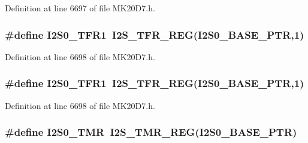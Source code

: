 Definition at line 6697 of file M\+K20\+D7.\+h.

\subsubsection[{\texorpdfstring{I2\+S0\+\_\+\+T\+F\+R1}{I2S0_TFR1}}]{\setlength{\rightskip}{0pt plus 5cm}\#define I2\+S0\+\_\+\+T\+F\+R1~{\bf I2\+S\+\_\+\+T\+F\+R\+\_\+\+R\+EG}({\bf I2\+S0\+\_\+\+B\+A\+S\+E\+\_\+\+P\+TR},1)}\hypertarget{group___i2_s___register___accessor___macros_ga32ed249c5e7a458a93e9627ff31f31e6}{}\label{group___i2_s___register___accessor___macros_ga32ed249c5e7a458a93e9627ff31f31e6}


Definition at line 6698 of file M\+K20\+D7.\+h.

\subsubsection[{\texorpdfstring{I2\+S0\+\_\+\+T\+F\+R1}{I2S0_TFR1}}]{\setlength{\rightskip}{0pt plus 5cm}\#define I2\+S0\+\_\+\+T\+F\+R1~{\bf I2\+S\+\_\+\+T\+F\+R\+\_\+\+R\+EG}({\bf I2\+S0\+\_\+\+B\+A\+S\+E\+\_\+\+P\+TR},1)}\hypertarget{group___i2_s___register___accessor___macros_ga32ed249c5e7a458a93e9627ff31f31e6}{}\label{group___i2_s___register___accessor___macros_ga32ed249c5e7a458a93e9627ff31f31e6}


Definition at line 6698 of file M\+K20\+D7.\+h.

\subsubsection[{\texorpdfstring{I2\+S0\+\_\+\+T\+MR}{I2S0_TMR}}]{\setlength{\rightskip}{0pt plus 5cm}\#define I2\+S0\+\_\+\+T\+MR~{\bf I2\+S\+\_\+\+T\+M\+R\+\_\+\+R\+EG}({\bf I2\+S0\+\_\+\+B\+A\+S\+E\+\_\+\+P\+TR})}\hypertarget{group___i2_s___register___accessor___macros_gadedf7b57a0f8f42bc0d282b45cd749b7}{}\label{group___i2_s___register___accessor___macros_gadedf7b57a0f8f42bc0d282b45cd749b7}


